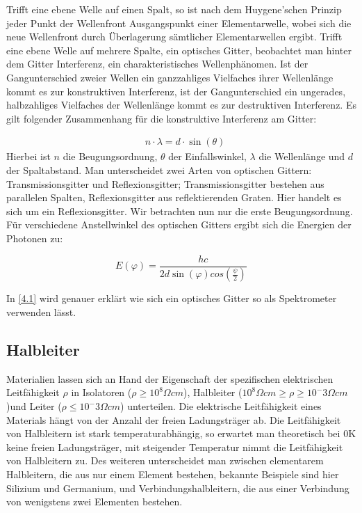 \documentclass[12pt]{article}
\begin{document}
Trifft eine ebene Welle auf einen Spalt, so ist nach dem Huygene'schen Prinzip jeder Punkt der Wellenfront Ausgangspunkt einer Elementarwelle, wobei sich die neue Wellenfront durch Überlagerung sämtlicher Elementarwellen ergibt. Trifft eine ebene Welle auf mehrere Spalte, ein optisches Gitter, beobachtet man hinter dem Gitter Interferenz, ein charakteristisches Wellenphänomen.  Ist der Gangunterschied zweier Wellen ein ganzzahliges Vielfaches ihrer Wellenlänge kommt es zur konstruktiven Interferenz, ist der Gangunterschied ein ungerades, halbzahliges Vielfaches der Wellenlänge kommt es zur destruktiven Interferenz. Es gilt folgender Zusammenhang für die konstruktive Interferenz am Gitter:

\begin{align*}
& n\cdot\lambda=d\cdot\sin(\theta)
\end{align*}
Hierbei ist $n$ die Beugungsordnung, $\theta$ der Einfallswinkel, $\lambda$ die Wellenlänge und $d$ der Spaltabstand.
Man unterscheidet zwei Arten von optischen Gittern: Transmissionsgitter und Reflexionsgitter; Transmissionsgitter bestehen aus parallelen Spalten, Reflexionsgitter aus reflektierenden Graten. Hier handelt es sich um ein Reflexionsgitter. Wir betrachten nun nur die erste Beugungsordnung. Für verschiedene Anstellwinkel des optischen Gitters ergibt sich die Energien der Photonen zu:

\[E(\varphi)=\frac{hc}{2d\sin(\varphi)cos(\frac{\psi}{2})}\]

In \ref{4.1} wird genauer erklärt wie sich ein optisches Gitter so als Spektrometer verwenden lässt.

\subsection{Halbleiter}

Materialien lassen sich an Hand der Eigenschaft der spezifischen elektrischen Leitfähigkeit $\rho$ in Isolatoren ($\rho \geq 10^8\Omega cm$), Halbleiter ($10^8\Omega cm \geq \rho \geq 10^-3 \Omega cm $)und Leiter ($\rho \leq 10^-3 \Omega cm$) unterteilen. Die elektrische Leitfähigkeit eines Materials hängt von der Anzahl der freien Ladungsträger ab. Die Leitfähigkeit von Halbleitern ist stark temperaturabhängig, so erwartet man theoretisch bei $0$K keine freien Ladungsträger, mit steigender Temperatur nimmt die Leitfähigkeit von Halbleitern zu. 
Des weiteren unterscheidet man zwischen elementarem Halbleitern, die aus nur einem Element bestehen, bekannte Beispiele sind hier Silizium und Germanium, und Verbindungshalbleitern, die aus einer Verbindung von wenigstens  zwei Elementen bestehen. 
\end{document}
